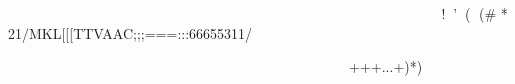 

















	
	

















		





	

		



						  
	
!'( (# *$$21/MKL[[[TTVAAC;;;===:::66655311/





                                       +++...+)*)%
		



	

	   
	
				




										




						





	



						




	

	


































	
	




















	

	
	








